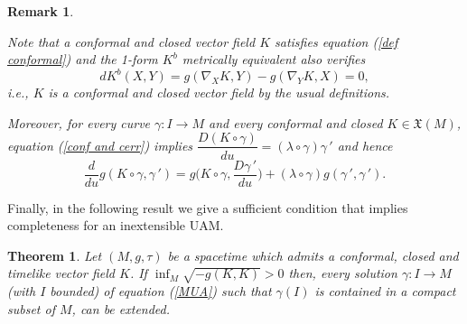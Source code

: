 \documentclass[11pt]{book}
\newtheorem{theor}[defi]{Theorem}
\newtheorem{rem}[defi]{Remark}
\def\x{\mathfrak X}
\begin{document}
\begin{rem}\label{remark conf and closed}
	{\rm Note that a conformal and closed vector field $K$ satisfies equation (\ref{def conformal}) and the 1-form $K^b$ metrically equivalent also verifies
	\[
	dK^b(X,Y) = g(\nabla_X K, Y) - g(\nabla_Y K, X) =0,
	\]
	i.e., $K$ is a conformal and closed vector field by the usual definitions.
	
	Moreover, for every curve $\gamma:I\to M$ and every conformal and closed $K\in\x(M)$, equation (\ref{conf and cerr}) implies $\dfrac{D(K\circ \gamma)}{du}=(\lambda\circ \gamma) \gamma{\,'}$ and hence
	\begin{equation}\label{CC}
		\dfrac{d}{du}g(K\circ \gamma,\gamma{\,'})=g\Big(K\circ \gamma,\dfrac{D\gamma{\,'}}{du}\Big)+ (\lambda\circ \gamma)g(\gamma{\,'},\gamma{\,'}).
	\end{equation}
}
\end{rem}

\vspace{5mm}
Finally, in the following result we give a sufficient condition that implies completeness for an inextensible UAM.
\begin{theor}\label{completitud}
	Let $(M,g,\tau)$ be a spacetime which admits a conformal, closed and timelike vector field $K$. If $\inf_M\sqrt{-g(K,K)}>0$ then, every solution $\gamma:I\to M$ (with $I$ bounded) of equation {\rm (\ref{MUA})} such that $\gamma(I)$ is contained in a compact subset of $M$, can be extended.
\end{theor}
\end{document}
